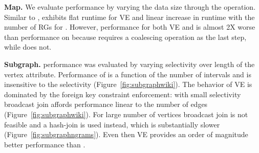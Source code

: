 {\bf Map.}  We evaluate  performance by varying the data
size through the  operation.  Similar to ,
 exhibits flat runtime for VE and linear increase in
runtime with the number of RGs for \sg.  However, performance for both
VE and \sg is almost 2X worse than performance on 
because  requires a coalescing operation as the last step,
while  does not.

{\bf Subgraph.}   performance was evaluated by varying
selectivity over length of the vertex attribute.  Performance of \sg
is a function of the number of intervals and is insensitive to the
selectivity (Figure~\ref{fig:subgraphwiki}).  The behavior of VE is
dominated by the foreign key constraint enforcement: with small
selectivity broadcast join affords performance linear to the number of
edges (Figure~\ref{fig:subgraphwiki}).  For large number of vertices
broadcast join is not feasible and a hash-join is used instead, which
is substantially slower (Figure~\ref{fig:subgraphngrams}).  Even then
VE provides an order of magnitude better performance than \sg.

